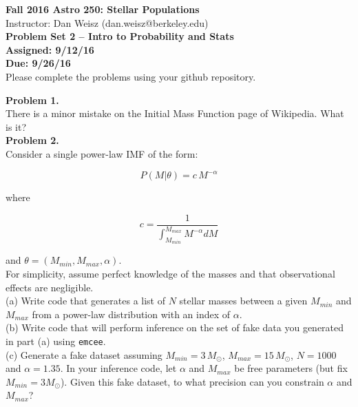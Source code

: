 \documentclass{article}
\begin{document}
\noindent \textbf{\large{Fall 2016 Astro 250: Stellar Populations}} \\
\noindent Instructor: Dan Weisz (dan.weisz@berkeley.edu) \\
\textbf{\large{Problem Set 2 -- Intro to Probability and Stats}} \\
\textbf{{Assigned: 9/12/16}} \\
\textbf{{Due: 9/26/16}} \\

Please complete the problems using your github repository.

\noindent \textbf{Problem 1.} \\ 

There is a minor mistake on the Initial Mass Function page of Wikipedia.  What is it? \\


\noindent \textbf{Problem 2.} \\ 

Consider a single power-law IMF of the form:

\begin{equation}
P(M | \theta) = c \, M^{-\alpha}
\end{equation}

\noindent where 

\begin{equation}
c = \frac{1}{\int_{M_{min}}^{M_{max}} M^{-\alpha} dM} 
\end{equation}

\noindent and $\theta = (M_{min}, M_{max}, \alpha )$. \\

For simplicity, assume perfect knowledge of the masses and that observational effects are negligible.  \\


(a) Write code that generates a list of $N$ stellar masses between a given $M_{min}$ and $M_{max}$ from a power-law distribution with an index of $\alpha$.\\

(b) Write code that will perform inference on the set of fake data you generated in part (a) using \texttt{emcee}.\\

(c) Generate a fake dataset assuming $M_{min}=3 \, M_{\odot}$, $M_{max}=15 \, M_{\odot}$, $N=1000$ and $\alpha=1.35$.  In your inference code, let $\alpha$ and $M_{max}$ be free parameters (but fix $M_{min}=3 M_{\odot}$).  Given this fake dataset, to what precision can you constrain $\alpha$ and $M_{max}$? \\
\end{document}
